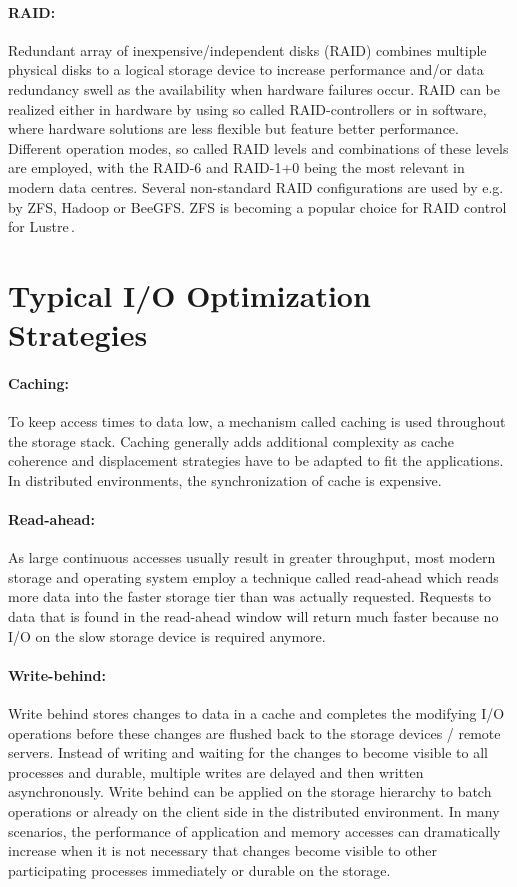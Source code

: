 \paragraph{RAID:} Redundant array of inexpensive/independent disks (RAID) combines multiple physical disks to a logical storage device
to increase performance and/or data redundancy swell as the availability when hardware failures occur. RAID can be realized either in hardware
by using so called RAID-controllers or in software, where hardware solutions are less flexible but feature better performance. Different operation modes,
so called RAID levels and combinations of these levels are employed, with the RAID-6 and RAID-1+0 being the most relevant in modern data centres.
Several non-standard RAID configurations are used by e.g. by ZFS, Hadoop or BeeGFS.
ZFS is becoming a popular choice for RAID control for Lustre\,\cite{richreport_lustre_2013}.


\section{Typical I/O Optimization Strategies}
\label{sec:defio}

\paragraph{Caching:}
To keep access times to data low, a mechanism called caching is used throughout the storage stack.
Caching generally adds additional complexity as cache coherence and displacement strategies have to be adapted to fit the applications.
In distributed environments, the synchronization of cache is expensive.

\paragraph{Read-ahead:}
As large continuous accesses usually result in greater throughput, most modern storage and operating system employ a technique called read-ahead which reads more data into the faster storage tier than was actually requested.
Requests to data that is found in the read-ahead window will return much faster because no I/O on the slow storage device is required anymore.

\paragraph{Write-behind:}
Write behind stores changes to data in a cache and completes the modifying I/O operations before these changes are flushed back to the storage devices / remote servers.
Instead of writing and waiting for the changes to become visible to all processes and durable, multiple writes are delayed and then written asynchronously.
Write behind can be applied on the storage hierarchy to batch operations or already on the client side in the distributed environment.
In many scenarios, the performance of application and memory accesses can dramatically increase when it is not necessary that changes become visible to other participating processes immediately or durable on the storage.

